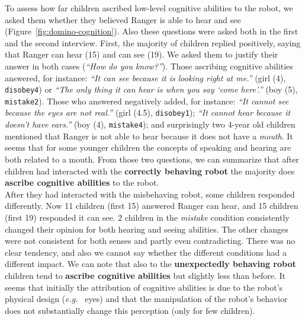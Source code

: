 \documentclass{sig-alternate}
\newcommand{\eg}{{\textit{e.g.~}}}
\begin{document}
To assess how far children ascribed low-level cognitive abilities to the robot,
we asked them whether they believed Ranger is able to hear and see
(Figure~\ref{fig:domino-cognition}). Also these questions were asked both in the
first and the second interview. First, the majority of children replied
positively, saying that Ranger can hear (15) and can see (19). We asked them to
justify their answer in both cases (\textit{``How do you know?''}). Those
ascribing cognitive abilities answered, for instance: \textit{``It can see
because it is looking right at me.''} (girl (4), \texttt{disobey4}) or
\textit{``The only thing it can hear is when you say `come here'.''} (boy (5),
\texttt{mistake2}). Those who answered negatively added, for instance:
\textit{``It cannot see because the eyes are not real.''} (girl (4.5),
\texttt{disobey1}); \textit{``It cannot hear because it doesn't have ears.''}
(boy (4), \texttt{mistake4}); and surprisingly two 4-year old children mentioned
that Ranger is not able to hear because it does not have a \textit{mouth}. It
seems that for some younger children the concepts of speaking and hearing are
both related to a mouth. From those two questions, we can summarize that after
children had interacted with the \textbf{correctly behaving robot} the majority
does \textbf{ascribe cognitive abilities} to the robot.\\

After they had interacted with the misbehaving robot, some children responded
differently. Now 11 children (first 15) answered Ranger can hear, and 15
children (first 19) responded it can see. 2 children in the \textit{mistake}
condition consistently changed their opinion for both hearing and seeing
abilities. The other changes were not consistent for both senses and partly even
contradicting. There was no clear tendency, and also we cannot say whether the
different conditions had a different impact. We can note that also to the
\textbf{unexpectedly behaving robot} children tend to \textbf{ascribe cognitive
abilities} but slightly less than before. It seems that initially the
attribution of cognitive abilities is due to the robot's physical design (\eg
eyes) and that the manipulation of the robot's behavior does not substantially
change this perception (only for few children). 
\end{document}
